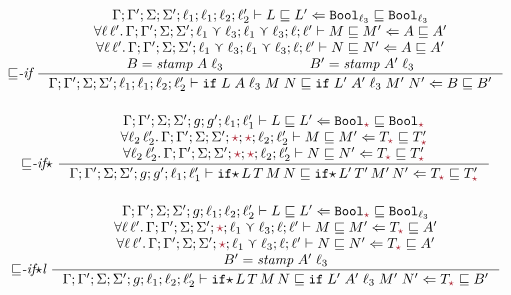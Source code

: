 \begin{figure}[tbp]
\raggedright
  {\small
  \begin{gather*}
  {\sqsubseteq}\textit{-if}~
  \inference{\precctx{\Gamma}{\Gamma'}{\Sigma}{\Sigma'}{\ell_1}{\ell_1}{\ell_2}{\ell_2'}\ccprec{L}{L'}{\Bool_{\ell_3}}{\Bool_{\ell_3}} \\
      \forall \ell\,\ell'.\,\precctx{\Gamma}{\Gamma'}{\Sigma}{\Sigma'}{\ell_1 \curlyvee \ell_3}{\ell_1 \curlyvee \ell_3}{\ell}{\ell'}\ccprec{M}{M'}{A}{A'} \\
      \forall \ell\,\ell'.\,\precctx{\Gamma}{\Gamma'}{\Sigma}{\Sigma'}{\ell_1 \curlyvee \ell_3}{\ell_1 \curlyvee \ell_3}{\ell}{\ell'}\ccprec{N}{N'}{A}{A'} \\
      B = \mathit{stamp}\;A\;\ell_3 & B' = \mathit{stamp}\;A'\;\ell_3}
            {\precctx{\Gamma}{\Gamma'}{\Sigma}{\Sigma'}{\ell_1}{\ell_1}{\ell_2}{\ell_2'}\ccprec{\ccif{L}{A}{\ell_3}{M}{N}}{\ccif{L'}{A'}{\ell_3}{M'}{N'}}{B}{B'}}
  \\[3ex]
  {\sqsubseteq}\textit{-if}{\star}~
  \inference{\precctx{\Gamma}{\Gamma'}{\Sigma}{\Sigma'}{g}{g'}{\ell_1}{\ell_1'}\ccprec{L}{L'}{\Bool_{\unk}}{\Bool_{\unk}} \\
      \forall \ell_2\,\ell_2'.\,\precctx{\Gamma}{\Gamma'}{\Sigma}{\Sigma'}{\unk}{\unk}{\ell_2}{\ell_2'}\ccprec{M}{M'}{T_{\unk}}{T'_{\unk}} \\
      \forall \ell_2\,\ell_2'.\,\precctx{\Gamma}{\Gamma'}{\Sigma}{\Sigma'}{\unk}{\unk}{\ell_2}{\ell_2'}\ccprec{N}{N'}{T_{\unk}}{T'_{\unk}} }
            {\precctx{\Gamma}{\Gamma'}{\Sigma}{\Sigma'}{g}{g'}{\ell_1}{\ell_1'}\ccprec{\ccifstar{L}{T}{M}{N}}{\ccifstar{L'}{T'}{M'}{N'}}{T_{\unk}}{T'_{\unk}}}
  \\[3ex]
  {\sqsubseteq}\textit{-if${\star}$l}~
  \inference{\precctx{\Gamma}{\Gamma'}{\Sigma}{\Sigma'}{g}{\ell_1}{\ell_2}{\ell_2'}\ccprec{L}{L'}{\Bool_{\unk}}{\Bool_{\ell_3}} \\
    \forall \ell\,\ell'.\,\precctx{\Gamma}{\Gamma'}{\Sigma}{\Sigma'}{\unk}{\ell_1 \curlyvee \ell_3}{\ell}{\ell'}\ccprec{M}{M'}{T_{\unk}}{A'} \\
    \forall \ell\,\ell'.\,\precctx{\Gamma}{\Gamma'}{\Sigma}{\Sigma'}{\unk}{\ell_1 \curlyvee \ell_3}{\ell}{\ell'}\ccprec{N}{N'}{T_{\unk}}{A'} \\
    B' = \mathit{stamp}\;A'\;\ell_3}
            {\precctx{\Gamma}{\Gamma'}{\Sigma}{\Sigma'}{g}{\ell_1}{\ell_2}{\ell_2'}\ccprec{\ccifstar{L}{T}{M}{N}}{\ccif{L'}{A'}{\ell_3}{M'}{N'}}{T_{\unk}}{B'}}

\end{gather*}}
\end{figure}
